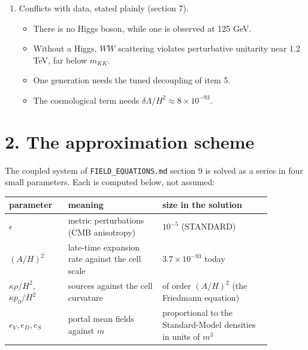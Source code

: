 \documentclass[11pt]{article}
\begin{document}
\begin{enumerate}
\begin{itemize}
\item With $N_{eff} = 2.99$ and $\theta_*$ fixed, $H_0 = 66.75$ km/s/Mpc and $r_{drag} = 147.4$ Mpc. The eBOSS DR16 BAO give $\chi^2 = 11.6$ for 12 points (Planck $\Lambda$CDM: 10.2).
\item The CNB has $T_\nu = (4/11)^{1/3}T_{CMB} = 1.945$ K.
\end{itemize}
\item Conflicts with data, stated plainly (section 7).
\begin{itemize}
\item There is no Higgs boson, while one is observed at 125 GeV.
\item Without a Higgs, $WW$ scattering violates perturbative unitarity near 1.2 TeV, far below $m_{KK}$.
\item One generation needs the tuned decoupling of item 5.
\item The cosmological term needs $\delta\Lambda/H^2 \approx 8\times10^{-93}$.
\end{itemize}
\end{enumerate}

\section*{2. The approximation scheme}

The coupled system of \texttt{FIELD\_\allowbreak{}EQUATIONS.\allowbreak{}md} section 9 is solved as a series in four small parameters. Each is computed below, not assumed:

\begin{longtable}{>{\raggedright\arraybackslash}p{0.182\linewidth}>{\raggedright\arraybackslash}p{0.318\linewidth}>{\raggedright\arraybackslash}p{0.368\linewidth}}
\toprule
\textbf{parameter} & \textbf{meaning} & \textbf{size in the solution} \\
\midrule
$\epsilon$ & metric perturbations (CMB anisotropy) & $10^{-5}$ (STANDARD) \\
$(A/H)^2$ & late-time expansion rate against the cell scale & $3.7\times10^{-93}$ today \\
$\kappa\rho/H^2$, $\kappa p_0/H^2$ & sources against the cell curvature & of order $(A/H)^2$ (the Friedmann equation) \\
$e_V, e_D, e_S$ & portal mean fields against $m$ & proportional to the Standard-Model densities in units of $m^3$ \\
\bottomrule
\end{longtable}
\end{document}
